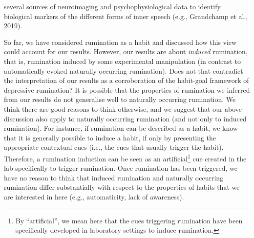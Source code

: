 \documentclass[a4paper,12pt,twoside,onecolumn,openright,final,oldfontcommands]{memoir}
\let\rmarkdownfootnote\footnote%
\def\footnote{\protect\rmarkdownfootnote}
\begin{document}
several sources of neuroimaging and psychophysiological data to identify biological markers of the different forms of inner speech (e.g., Grandchamp et al., \protect\hyperlink{ref-grandchamp_neurocognitive_2019}{2019}).

So far, we have considered rumination as a habit and discussed how this view could account for our results. However, our results are about \emph{induced} rumination, that is, rumination induced by some experimental manipulation (in contrast to automatically evoked naturally occurring rumination). Does not that contradict the interpretation of our results as a corroboration of the habit-goal framework of depressive rumination? It is possible that the properties of rumination we inferred from our results do not generalise well to naturally occurring rumination. We think there are good reasons to think otherwise, and we suggest that our above discussion also apply to naturally occurring rumination (and not only to induced rumination). For instance, if rumination can be described as a habit, we know that it is generally possible to induce a habit, if only by presenting the appropriate contextual cues (i.e., the cues that usually trigger the habit). Therefore, a rumination induction can be seen as an artificial\footnote{By \enquote{artificial}, we mean here that the cues triggering rumination have been specifically developed in laboratory settings to induce rumination.} cue created in the lab specifically to trigger rumination. Once rumination has been triggered, we have no reason to think that induced rumination and naturally occurring rumination differ substantially with respect to the properties of habits that we are interested in here (e.g., automaticity, lack of awareness).
\end{document}
